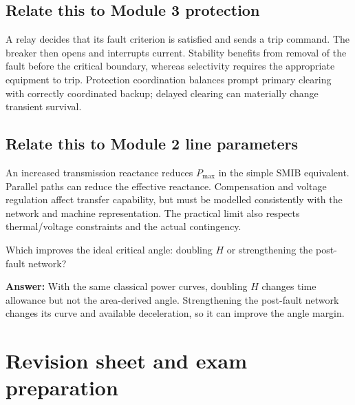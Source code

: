 \documentclass[11pt,a4paper]{article}
\newcommand{\chapterstart}[2]{\par\needspace{12\baselineskip}\section{#1}\label{#2}}
\newcommand{\checkq}[2]{\begin{tcolorbox}[breakable=false,colback=pale,colframe=teal,coltitle=white,title={Check your understanding}]#1\par\textbf{Answer:} #2\end{tcolorbox}}
\begin{document}
\subsection{Relate this to Module 3 protection}
A relay decides that its fault criterion is satisfied and sends a trip command. The breaker then opens and interrupts current. Stability benefits from removal of the fault before the critical boundary, whereas selectivity requires the appropriate equipment to trip. Protection coordination balances prompt primary clearing with correctly coordinated backup; delayed clearing can materially change transient survival.
\subsection{Relate this to Module 2 line parameters}
An increased transmission reactance reduces $P_{\max}$ in the simple SMIB equivalent. Parallel paths can reduce the effective reactance. Compensation and voltage regulation affect transfer capability, but must be modelled consistently with the network and machine representation. The practical limit also respects thermal/voltage constraints and the actual contingency.
\checkq{Which improves the ideal critical angle: doubling $H$ or strengthening the post-fault network?}{With the same classical power curves, doubling $H$ changes time allowance but not the area-derived angle. Strengthening the post-fault network changes its curve and available deceleration, so it can improve the angle margin.}

\chapterstart{Revision sheet and exam preparation}{revision}
\end{document}
